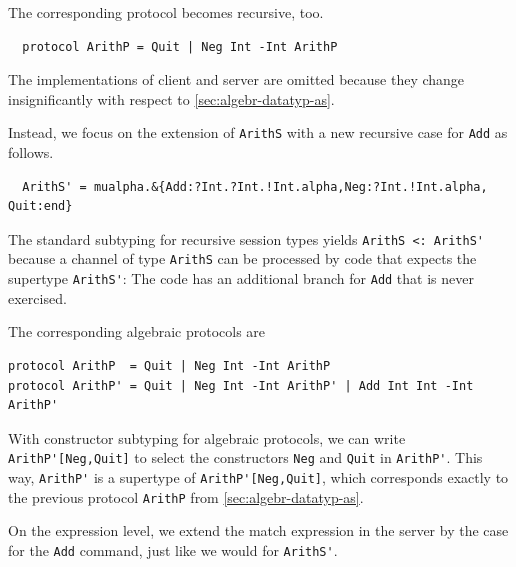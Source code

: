 The corresponding protocol becomes recursive, too.
\begin{lstlisting}
  protocol ArithP = Quit | Neg Int -Int ArithP
\end{lstlisting}

The implementations of client and  server are omitted because they
change insignificantly with respect to \cref{sec:algebr-datatyp-as}.



Instead, we focus on the extension of \lstinline+ArithS+ with
a new recursive case for \lstinline+Add+ as follows.
\begin{lstlisting}
  ArithS' = mualpha.&{Add:?Int.?Int.!Int.alpha,Neg:?Int.!Int.alpha, Quit:end}
\end{lstlisting}
The standard subtyping for recursive session types yields
\lstinline+ArithS <: ArithS'+ because a channel of type
\lstinline+ArithS+ can be processed by code that expects the supertype
\lstinline+ArithS'+: The code has an additional branch for \lstinline+Add+ that is never
exercised.

The corresponding algebraic protocols are
\begin{lstlisting}
protocol ArithP  = Quit | Neg Int -Int ArithP
protocol ArithP' = Quit | Neg Int -Int ArithP' | Add Int Int -Int ArithP'
\end{lstlisting}
With constructor subtyping for algebraic protocols, we can write
\lstinline+ArithP'[Neg,Quit]+ to select the
constructors \lstinline+Neg+ and \lstinline+Quit+ in
\lstinline+ArithP'+. 
This way, \lstinline+ArithP'+ is a supertype of 
\lstinline+ArithP'[Neg,Quit]+, which corresponds exactly to the
previous protocol \lstinline+ArithP+ from \cref{sec:algebr-datatyp-as}. 

On the expression level, we extend the match expression in the server
by the case for the \lstinline+Add+ command, just like we would for \lstinline+ArithS'+.


